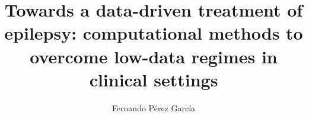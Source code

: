 \makeatletter
\title{Towards a data-driven treatment of epilepsy: computational methods to overcome low-data regimes in clinical settings}\let\thetitle\@title
\author{Fernando Pérez García}\let\theauthor\@author
\makeatother
